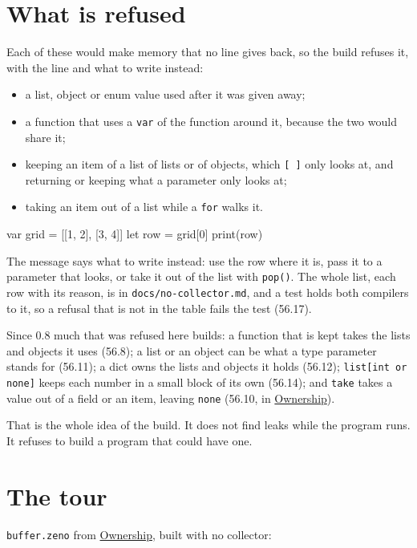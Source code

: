 \section{What is refused}

Each of these would make memory that no line gives back, so the build
refuses it, with the line and what to write instead:

\begin{itemize}
\item a list, object or enum value used after it was given away;
\item a function that uses a \verb|var| of the function around it,
  because the two would share it;
\item keeping an item of a list of lists or of objects, which
  \verb|[ ]| only looks at, and returning or keeping what a parameter
  only looks at;
\item taking an item out of a list while a \verb|for| walks it.
\end{itemize}

\begin{zeno}[file=items.zeno, cmd=zeno build --no-collector {file}, fails=yes]
var grid = [[1, 2], [3, 4]]
let row = grid[0]
print(row)
\end{zeno}

The message says what to write instead: use the row where it is, pass
it to a parameter that looks, or take it out of the list with
\verb|pop()|. The whole list, each row with its reason, is in
\verb|docs/no-collector.md|, and a test holds both compilers to it, so
a refusal that is not in the table fails the test (56.17).

Since 0.8 much that was refused here builds: a function that is kept
takes the lists and objects it uses (56.8); a list or an object can be
what a type parameter stands for (56.11); a dict owns the lists and
objects it holds (56.12); \verb|list[int or none]| keeps each number in
a small block of its own (56.14); and \verb|take| takes a value out of a
field or an item, leaving \verb|none| (56.10, in
\hyperref[ch-ownership]{Ownership}).

That is the whole idea of the build. It does not find leaks while the
program runs. It refuses to build a program that could have one.

\section{The tour}

\verb|buffer.zeno| from \hyperref[ch-ownership]{Ownership}, built with
no collector:

